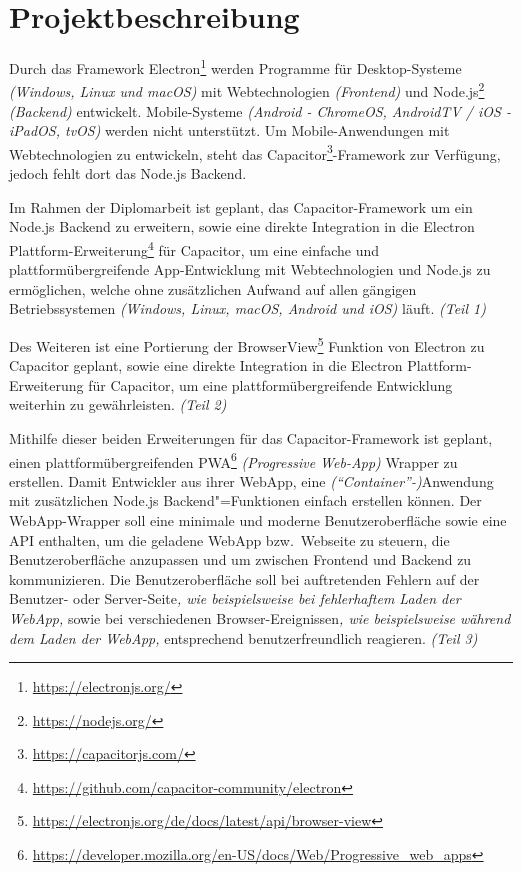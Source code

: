 \section{Projektbeschreibung}

Durch das Framework Electron\footnote{\url{https://electronjs.org/}} werden Programme für Desktop-Systeme \textit{(Windows, Linux und macOS)} mit Webtechnologien \textit{(Frontend)} und Node.js\footnote{\url{https://nodejs.org/}} \textit{(Backend)} entwickelt.
Mobile-Systeme \textit{(Android - ChromeOS, AndroidTV / iOS - iPadOS, tvOS)} werden nicht unterstützt.
Um Mobile-Anwendungen mit Webtechnologien zu entwickeln, steht das Capacitor\footnote{\url{https://capacitorjs.com/}}-Framework zur Verfügung, jedoch fehlt dort das Node.js Backend.

Im Rahmen der Diplomarbeit ist geplant, das Capacitor-Framework um ein Node.js Backend zu erweitern, sowie eine direkte Integration in die Electron Plattform-Erweiterung\footnote{\url{https://github.com/capacitor-community/electron}} für Capacitor, um eine einfache und plattformübergreifende App-Entwicklung mit Webtechnologien und Node.js zu ermöglichen, welche ohne zusätzlichen Aufwand auf allen gängigen Betriebssystemen \textit{(Windows, Linux, macOS, Android und iOS)} läuft.
\textit{(Teil 1)}

Des Weiteren ist eine Portierung der BrowserView\footnote{\url{https://electronjs.org/de/docs/latest/api/browser-view}} Funktion von Electron zu Capacitor geplant, sowie eine direkte Integration in die Electron Plattform-Erweiterung für Capacitor, um eine plattformübergreifende Entwicklung weiterhin zu gewährleisten.
\textit{(Teil 2)}

Mithilfe dieser beiden Erweiterungen für das Capacitor-Framework ist geplant, einen plattformübergreifenden PWA\footnote{\url{https://developer.mozilla.org/en-US/docs/Web/Progressive_web_apps}} \textit{(Progressive Web-App)} Wrapper zu erstellen.
Damit Entwickler aus ihrer WebApp, eine \textit{(\enquote{Container}-)}Anwendung mit zusätzlichen Node.js Backend"=Funktionen einfach erstellen können.
Der WebApp-Wrapper soll eine minimale und moderne Benutzeroberfläche sowie eine API enthalten, um die geladene WebApp bzw.\ Webseite zu steuern, die Benutzeroberfläche anzupassen und um zwischen Frontend und Backend zu kommunizieren.
Die Benutzeroberfläche soll bei auftretenden Fehlern auf der Benutzer- oder Server-Seite\textit{, wie beispielsweise bei fehlerhaftem Laden der WebApp,} sowie bei verschiedenen Browser-Ereignissen\textit{, wie beispielsweise während dem Laden der WebApp,} entsprechend benutzerfreundlich reagieren.
\textit{(Teil 3)}
